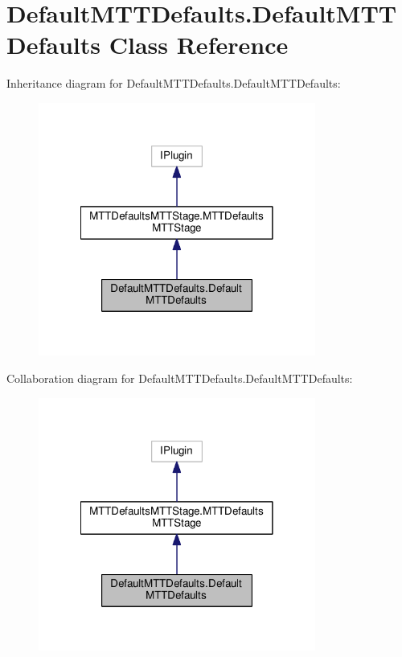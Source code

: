 \hypertarget{class_default_m_t_t_defaults_1_1_default_m_t_t_defaults}{\section{Default\-M\-T\-T\-Defaults.\-Default\-M\-T\-T\-Defaults Class Reference}
\label{class_default_m_t_t_defaults_1_1_default_m_t_t_defaults}
}


Inheritance diagram for Default\-M\-T\-T\-Defaults.\-Default\-M\-T\-T\-Defaults\-:
\nopagebreak
\begin{figure}[H]
\begin{center}
\leavevmode
\includegraphics[width=258pt]{class_default_m_t_t_defaults_1_1_default_m_t_t_defaults__inherit__graph}
\end{center}
\end{figure}


Collaboration diagram for Default\-M\-T\-T\-Defaults.\-Default\-M\-T\-T\-Defaults\-:
\nopagebreak
\begin{figure}[H]
\begin{center}
\leavevmode
\includegraphics[width=258pt]{class_default_m_t_t_defaults_1_1_default_m_t_t_defaults__coll__graph}
\end{center}
\end{figure}
